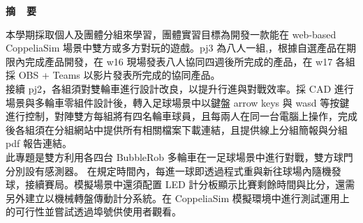 \renewcommand{\baselinestretch}{1.5} %
\clearpage  %
\sectionef
{} %
\begin{center}
\LARGE\textbf{摘~~要}\\
\end{center}
\begin{flushleft}
\fontsize{14pt}{20pt}\sectionef\hspace{12pt}\quad 本學期採取個人及團體分組來學習，團體實習目標為開發一款能在 web-based CoppeliaSim 場景中雙方或多方對玩的遊戲。pj3 為八人一組,，根據自選產品在期限內完成產品開發，在 w16 現場發表八人協同四週後所完成的產品，在 w17 各組採 OBS + Teams 以影片發表所完成的協同產品。\\[12pt]
\fontsize{14pt}{20pt}\sectionef\hspace{12pt}\quad  接續 pj2，各組須對雙輪車進行設計改良，以提升行進與對戰效率。採 CAD 進行場景與多輪車零組件設計後，轉入足球場景中以鍵盤 arrow keys 與 wasd 等按鍵進行控制，對陣雙方每組將有四名輪車球員，且每兩人在同一台電腦上操作，完成後各組須在分組網站中提供所有相關檔案下載連結，且提供線上分組簡報與分組 pdf 報告連結。\\[12pt]	
\fontsize{14pt}{20pt}\sectionef\hspace{12pt}\quad 此專題是雙方利用各四台 BubbleRob 多輪車在一足球場景中進行對戰，雙方球門分別設有感測器。 在規定時間內，每進一球即透過程式重與新往球場內隨機發球，接續賽局。模擬場景中還須配置 LED 計分板顯示比賽剩餘時間與比分，還需另外建立以機械轉盤傳動計分系統。在 CoppeliaSim 模擬環境中進行測試運用上的可行性並嘗試透過埠號供使用者觀看。\\[12pt]

\end{flushleft}
\newpage
\renewcommand{\baselinestretch}{1.5} %
